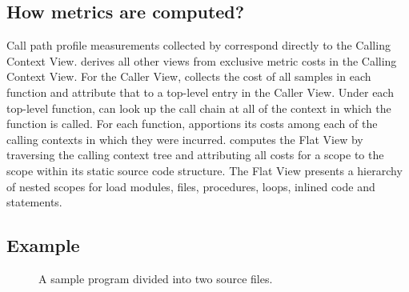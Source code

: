 
\subsection{How metrics are computed?}

Call path profile measurements collected by \hpcrun{} correspond directly to the Calling Context View.
\hpcviewer{} derives all other views from exclusive metric costs in the Calling Context View.
For the Caller View, \hpcviewer{} collects the cost of all samples in each function and attribute that to a top-level entry in the Caller View.
Under each top-level function, \hpcviewer{} can look up the call chain at all of the context in which the function is called.
For each function, \hpcviewer{} apportions its costs among each of the calling contexts in which they were incurred.
\hpcviewer{} computes the Flat View by traversing the calling context tree and attributing all costs for a scope to the scope within its static source code structure.
The Flat View presents a hierarchy of nested scopes for load modules, files, procedures, loops, inlined code and statements.



\subsection{Example}

\begin{figure}[t]
\caption{A sample program divided into two source files.}
\label{fig:source-files}
\end{figure}



